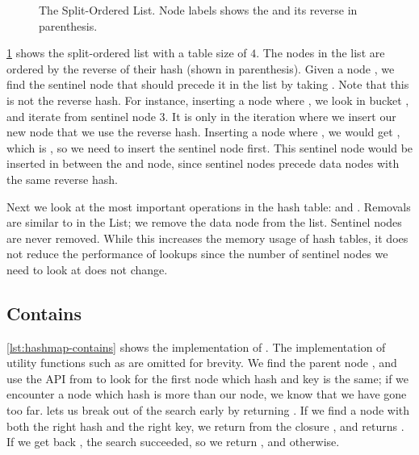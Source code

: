 \begin{figure}[ht]
\centering

\caption{The Split-Ordered List. Node labels shows the  and its reverse in
parenthesis.\label{fig:split-order-list}}
\end{figure}

\cref{fig:split-order-list} shows the split-ordered list with a table size of $4$. The nodes in the
list are ordered by the reverse of their hash (shown in parenthesis). Given a node , we
find the sentinel node that should precede it in the list by taking .
Note that this is not the reverse hash. For instance, inserting a node where ,
we look in bucket , and iterate from sentinel node 3. It is only in the iteration
where we insert our new node that we use the reverse hash.  Inserting a node where , we would get , which is , so we need to insert the sentinel node
first. This sentinel node would be inserted in between the  and  node, since
sentinel nodes precede data nodes with the same reverse hash.

Next we look at the most important operations in the hash table:  and .
Removals are similar to in the List; we remove the data node from the list. Sentinel nodes are
never removed. While this increases the memory usage of hash tables, it does not reduce the
performance of lookups since the number of sentinel nodes we need to look at does not change.

\subsection{Contains}

\cref{lst:hashmap-contains} shows the implementation of . The
implementation of utility functions such as  are omitted for brevity.  We
find the parent node , and use the  API from   to
look for the first node which hash and key is the same; if we encounter a node which hash is more
than our node, we know that we have gone too far.  lets us break out of
the search early by returning  . If we find a node with both the right
hash and the right key, we return  from the closure , and
 returns . If we get back , the search succeeded, so we
return , and  otherwise.  



